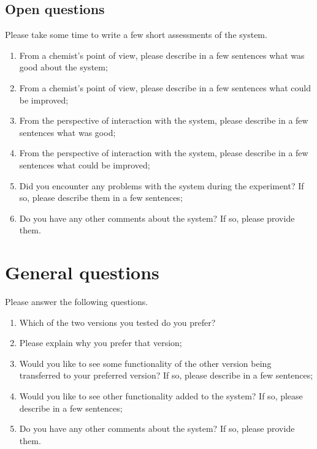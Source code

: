 \subsection*{Open questions}
Please take some time to write a few short assessments of the system.
\begin{enumerate}
\item From a chemist's point of view, please describe in a few sentences what was good about the system;
\item From a chemist's point of view, please describe in a few sentences what could be improved;
\item From the perspective of interaction with the system, please describe in a few sentences what was good;
\item From the perspective of interaction with the system, please describe in a few sentences what could be improved;
\item Did you encounter any problems with the system during the experiment? If so, please describe them in a few sentences;
\item Do you have any other comments about the system? If so, please provide them.
\end{enumerate}



\section{General questions}
Please answer the following questions.
\begin{enumerate}
\item Which of the two versions you tested do you prefer?
\item Please explain why you prefer that version;
\item Would you like to see some functionality of the other version being transferred to your preferred version? If so, please describe in a few sentences;
\item Would you like to see other functionality added to the system? If so, please describe in a few sentences;
\item Do you have any other comments about the system? If so, please provide them.
\end{enumerate}
